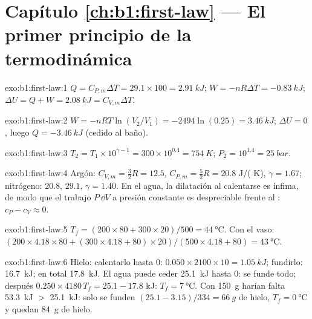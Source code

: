 \section*{Capítulo \ref{ch:b1:first-law} --- El primer principio de la termodinámica}

\begin{solution}{exo:b1:first-law:1}
$Q = C_{P,m}\Delta T = 29.1 \times 100 = \qty{2.91}{kJ}$; $W = -nR\Delta T =
\qty{-0.83}{kJ}$; $\Delta U = Q + W = \qty{2.08}{kJ} = C_{V,m}\Delta T$.
\end{solution}

\begin{solution}{exo:b1:first-law:2}
$W = -nRT\ln(V_2/V_1) = -2494\ln(0.25) = \qty{+3.46}{kJ}$; $\Delta U = 0$, luego
$Q = \qty{-3.46}{kJ}$ (cedido al baño).
\end{solution}

\begin{solution}{exo:b1:first-law:3}
$T_2 = T_1 \times 10^{\gamma - 1} = 300 \times 10^{0.4} = \qty{754}{K}$; $P_2 =
10^{1.4} = \qty{25}{bar}$.
\end{solution}

\begin{solution}{exo:b1:first-law:4}
Argón: $C_{V,m} = \tfrac32 R = 12.5$, $C_{P,m} = \tfrac52 R = 20.8$ J/( K),
$\gamma = 1.67$; nitrógeno: $20.8$, $29.1$, $\gamma = 1.40$. En el agua, la
dilatación al calentarse es ínfima, de modo que el trabajo $P\,\dd V$ a
presión constante es despreciable frente al : $c_P - c_V \approx 0$.
\end{solution}

\begin{solution}{exo:b1:first-law:5}
$T_f = (200 \times 80 + 300 \times 20)/500 = \qty{44}{\degreeCelsius}$. Con el
vaso: $(200 \times 4.18 \times 80 + (300 \times 4.18 + 80) \times 20)/(500 \times
4.18 + 80) = \qty{43}{\degreeCelsius}$.
\end{solution}

\begin{solution}{exo:b1:first-law:6}
Hielo: calentarlo hasta $0$: $0.050 \times 2100 \times 10 = \qty{1.05}{kJ}$; fundirlo:
\qty{16.7}{kJ}; en total \qty{17.8}{kJ}. El agua puede ceder \qty{25.1}{kJ} hasta
$0$: se funde todo; después $0.250 \times 4180\,T_f = 25.1 - 17.8$ kJ: $T_f =
\qty{7}{\degreeCelsius}$. Con \qty{150}{g} harían falta \qty{53.3}{kJ} $>$ \qty{25.1}{kJ}:
solo se funden $(25.1 - 3.15)/334 = \qty{66}{g}$ de hielo, $T_f = \qty{0}{\degreeCelsius}$
y quedan \qty{84}{g} de hielo.
\end{solution}

